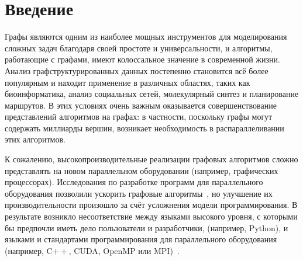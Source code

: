 \documentclass[14pt]{matmex-diploma-custom}
\begin{document}
\maketitle
\tableofcontents

\section*{Введение}
Графы являются одним из наиболее мощных инструментов для моделирования сложных задач благодаря своей простоте и универсальности, и алгоритмы, работающие с графами, имеют колоссальное значение в современной жизни. Анализ графструктурированных данных постепенно становится всё более популярным и находит применение в различных областях, таких как биоинформатика, анализ социальных сетей, молекулярный синтез и планирование маршрутов. В этих условиях очень важным оказывается совершенствование представлений алгоритмов на графах: в частности, поскольку графы могут содержать миллиарды вершин, возникает необходимость в распараллеливании этих алгоритмов.

К сожалению, высокопроизводительные реализации графовых алгоритмов сложно представлять на новом параллельном оборудовании (например, графических процессорах). Исследования по разработке программ для параллельного оборудования позволили ускорить графовые алгоритмы~\cite{Ligra, Gunrock}, но улучшение их производительности произошло за счёт усложнения модели программирования. В результате возникло несоответствие между языками высокого уровня, с которыми бы предпочли иметь дело пользователи и разработчики, (например, Python), и языками и стандартами программирования для параллельного оборудования (например, C$++$, CUDA, OpenMP или MPI)~\cite{GraphBLAST}. 
\end{document}
